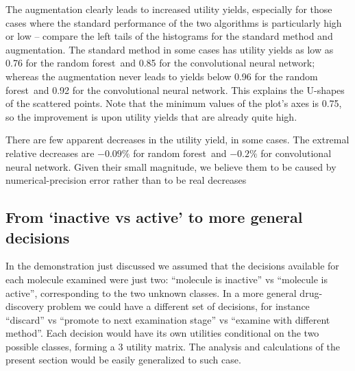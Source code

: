 \documentclass[\ifafour a4paper,12pt,\else a5paper,10pt,\fi%
onecolumn,oneside,article,%
british%
]{memoir}
\theoremstyle{remark}
\theoremstyle{innote}
\renewcommand*{\|}[1][]{\nonscript\:#1\vert\nonscript\:\mathopen{}}
\newcommand*{\RF}{random forest}
\newcommand*{\CNN}{convolutional neural network}
\begin{document}
The augmentation clearly leads to increased utility yields, especially for those cases where the standard performance of the two algorithms is particularly high or low -- compare the left tails of the histograms for the standard method and augmentation. The standard method in some cases has utility yields as low as 0.76 for the \RF\ and 0.85 for the \CNN; whereas the augmentation never leads to yields below 0.96 for the \RF\ and 0.92 for the \CNN. This explains the U-shapes of the scattered points. Note that the minimum values of the plot's axes is 0.75, so the improvement is upon utility yields that are already quite high.

There are few apparent decreases in the utility yield, in some cases. The extremal relative decreases are $-0.09\%$ for \RF\ and  $-0.2\%$ for \CNN. Given their small magnitude, we believe them to be caused by numerical-precision error rather than to be real decreases %

\subsection{From `inactive vs active' to more general decisions}
\label{sec:gen_decision}

In the demonstration just discussed we assumed that the decisions available for each molecule examined were just two: \enquote{molecule is inactive} vs \enquote{molecule is active}, corresponding to the two unknown classes. In a more general drug-discovery problem we could have a different set of decisions, for instance \enquote{discard} vs \enquote{promote to next examination stage} vs \enquote{examine with different method}. Each decision would have its own utilities conditional on the two possible classes, forming a 3 utility matrix. The analysis and calculations of the present section would be easily generalized to such case.
\end{document}
